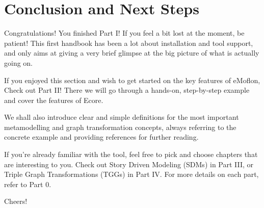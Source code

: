 \newpage
\noHeader

\vspace*{2cm}

\section{Conclusion and Next Steps}
\vspace{0.5cm}

Congratulations!\hypertarget{conclusion}{} You finished Part I! If you feel a bit lost at the moment, be patient! This first handbook has been a lot about installation and tool support, and only aims at giving a very brief glimpse at the big picture of what is actually going on.  

If you enjoyed this section and wish to get started on the key features of eMoflon, Check out Part II! There we will go through a hands-on, step-by-step example and cover the features of Ecore.

We shall also introduce clear and simple definitions for the most important metamodelling and graph transformation concepts, always referring to the concrete example and providing references for further reading.

If you're already familiar with the tool, feel free to pick and choose chapters that are interesting to you. Check out Story Driven Modeling (SDMs) in Part III, or Triple Graph Transformations (TGGs) in Part IV. For more details on each part, refer to Part 0.

Cheers!